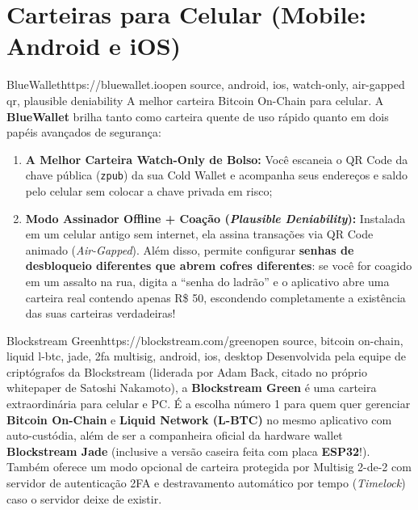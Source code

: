 \documentclass{pousadaguide}
\begin{document}
\clearpage
\section{Carteiras para Celular (Mobile: Android e iOS)}

\begin{ferramenta}[goat,logo=bluewallet]{BlueWallet}{https://bluewallet.io}{open source, android, ios, watch-only, air-gapped qr, plausible deniability}
A melhor carteira Bitcoin On-Chain para celular. A \textbf{BlueWallet} brilha tanto como carteira quente de uso rápido quanto em dois papéis avançados de segurança:
\begin{enumerate}
  \item \textbf{A Melhor Carteira Watch-Only de Bolso:} Você escaneia o QR Code da chave pública (\texttt{zpub}) da sua Cold Wallet e acompanha seus endereços e saldo pelo celular sem colocar a chave privada em risco;
  \item \textbf{Modo Assinador Offline + Coação (\emph{Plausible Deniability}):} Instalada em um celular antigo sem internet, ela assina transações via QR Code animado (\emph{Air-Gapped}). Além disso, permite configurar \textbf{senhas de desbloqueio diferentes que abrem cofres diferentes}: se você for coagido em um assalto na rua, digita a ``senha do ladrão'' e o aplicativo abre uma carteira real contendo apenas R\$ 50, escondendo completamente a existência das suas carteiras verdadeiras!
\end{enumerate}
\end{ferramenta}

\begin{ferramenta}[goat,logo=green]{Blockstream Green}{https://blockstream.com/green}{open source, bitcoin on-chain, liquid l-btc, jade, 2fa multisig, android, ios, desktop}
Desenvolvida pela equipe de criptógrafos da Blockstream (liderada por Adam Back, citado no próprio whitepaper de Satoshi Nakamoto), a \textbf{Blockstream Green} é uma carteira extraordinária para celular e PC. É a escolha número 1 para quem quer gerenciar \textbf{Bitcoin On-Chain} e \textbf{Liquid Network (L-BTC)} no mesmo aplicativo com auto-custódia, além de ser a companheira oficial da hardware wallet \textbf{Blockstream Jade} (inclusive a versão caseira feita com placa \textbf{ESP32}!). Também oferece um modo opcional de carteira protegida por Multisig 2-de-2 com servidor de autenticação 2FA e destravamento automático por tempo (\emph{Timelock}) caso o servidor deixe de existir. 
\end{ferramenta}
\end{document}
